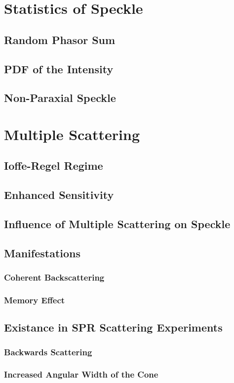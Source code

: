 \documentclass[a4paper,titlepage,onecolumn]{report}
\begin{document}
 \section{Statistics of Speckle}
  \subsection{Random Phasor Sum}
  \subsection{PDF of the Intensity}
  \subsection{Non-Paraxial Speckle}
 \section{Multiple Scattering}
  \subsection{Ioffe-Regel Regime}
  \subsection{Enhanced Sensitivity}
  \subsection{Influence of Multiple Scattering on Speckle}
  \subsection{Manifestations}
   \subsubsection{Coherent Backscattering}
   \subsubsection{Memory Effect}
  \subsection{Existance in SPR Scattering Experiments}
   \subsubsection{Backwards Scattering}
   \subsubsection{Increased Angular Width of the Cone}
\end{document}
